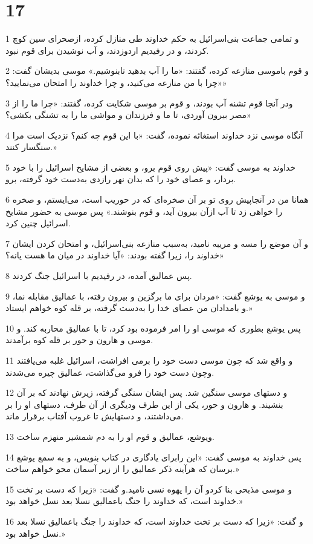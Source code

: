 \chapter{17}

\par 1 و تمامی جماعت بنی‌اسرائیل به حکم خداوند طی منازل کرده، ازصحرای سین کوچ کردند، و در رفیدیم اردوزدند، و آب نوشیدن برای قوم نبود.
\par 2 و قوم باموسی منازعه کرده، گفتند: «ما را آب بدهید تابنوشیم.» موسی بدیشان گفت: «چرا با من منازعه می‌کنید، و چرا خداوند را امتحان می‌نمایید؟»
\par 3 ودر آنجا قوم تشنه آب بودند، و قوم بر موسی شکایت کرده، گفتند: «چرا ما را از مصر بیرون آوردی، تا ما و فرزندان و مواشی ما را به تشنگی بکشی؟»
\par 4 آنگاه موسی نزد خداوند استغاثه نموده، گفت: «با این قوم چه کنم؟ نزدیک است مرا سنگسار کنند.»
\par 5 خداوند به موسی گفت: «پیش روی قوم برو، و بعضی از مشایخ اسرائیل را با خود بردار، و عصای خود را که بدان نهر رازدی به‌دست خود گرفته، برو.
\par 6 همانا من در آنجاپیش روی تو بر آن صخره‌ای که در حوریب است، می‌ایستم، و صخره را خواهی زد تا آب ازآن بیرون آید، و قوم بنوشند.» پس موسی به حضور مشایخ اسرائیل چنین کرد.
\par 7 و آن موضع را مسه و مریبه نامید، به‌سبب منازعه بنی‌اسرائیل، و امتحان کردن ایشان خداوند را، زیرا گفته بودند: «آیا خداوند در میان ما هست یانه؟»
\par 8 پس عمالیق آمده، در رفیدیم با اسرائیل جنگ کردند.
\par 9 و موسی به یوشع گفت: «مردان برای ما برگزین و بیرون رفته، با عمالیق مقابله نما، و بامدادان من عصای خدا را به‌دست گرفته، بر قله کوه خواهم ایستاد.»
\par 10 پس یوشع بطوری که موسی او را امر فرموده بود کرد، تا با عمالیق محاربه کند. و موسی و هارون و حور بر قله کوه برآمدند.
\par 11 و واقع شد که چون موسی دست خود را برمی افراشت، اسرائیل غلبه می‌یافتند وچون دست خود را فرو می‌گذاشت، عمالیق چیره می‌شدند.
\par 12 و دستهای موسی سنگین شد. پس ایشان سنگی گرفته، زیرش نهادند که بر آن بنشیند. و هارون و حور، یکی از این طرف ودیگری از آن طرف، دستهای او را بر می‌داشتند، و دستهایش تا غروب آفتاب برقرار ماند.
\par 13 ویوشع، عمالیق و قوم او را به دم شمشیر منهزم ساخت.
\par 14 پس خداوند به موسی گفت: «این رابرای یادگاری در کتاب بنویس، و به سمع یوشع برسان که هرآینه ذکر عمالیق را از زیر آسمان محو خواهم ساخت.»
\par 15 و موسی مذبحی بنا کردو آن را یهوه نسی نامید.و گفت: «زیرا که دست بر تخت خداوند است، که خداوند را جنگ باعمالیق نسلا بعد نسل خواهد بود.»
\par 16 و گفت: «زیرا که دست بر تخت خداوند است، که خداوند را جنگ باعمالیق نسلا بعد نسل خواهد بود.»
 
